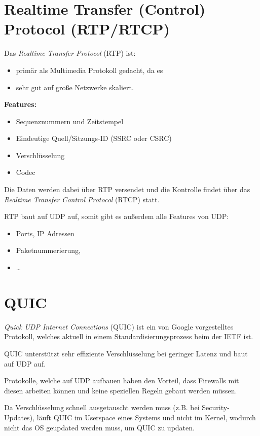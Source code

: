 	\section{Realtime Transfer (Control) Protocol (RTP/RTCP)}
		Das \textit{Realtime Transfer Protocol} (RTP) ist:
		\begin{itemize}
			\item primär als Multimedia Protokoll gedacht, da es
			\item sehr gut auf große Netzwerke skaliert.
		\end{itemize}

		\textbf{Features:}
		\begin{itemize}
			\item Sequenznummern und Zeitstempel
			\item Eindeutige Quell/Sitzungs-ID (SSRC oder CSRC)
			\item Verschlüsselung
			\item Codec
		\end{itemize}

		Die Daten werden dabei über RTP versendet und die Kontrolle findet über das \textit{Realtime Transfer Control Protocol} (RTCP) statt.

		RTP baut auf UDP auf, somit gibt es außerdem alle Features von UDP:
		\begin{itemize}
			\item Ports, IP Adressen
			\item Paketnummerierung,
			\item \dots
		\end{itemize}

	\section{QUIC}
		\textit{Quick UDP Internet Connections} (QUIC) ist ein von Google vorgestelltes Protokoll, welches aktuell in einem Standardisierungsprozess beim der IETF ist.

		QUIC unterstützt sehr effiziente Verschlüsselung bei geringer Latenz und baut auf UDP auf.

		Protokolle, welche auf UDP aufbauen haben den Vorteil, dass Firewalls mit diesen arbeiten können und keine speziellen Regeln gebaut werden müssen.

		Da Verschlüsselung schnell ausgetauscht werden muss (z.B. bei Security-Updates), läuft QUIC im Userspace eines Systems und nicht im Kernel, wodurch nicht das OS geupdated werden muss, um QUIC zu updaten.

